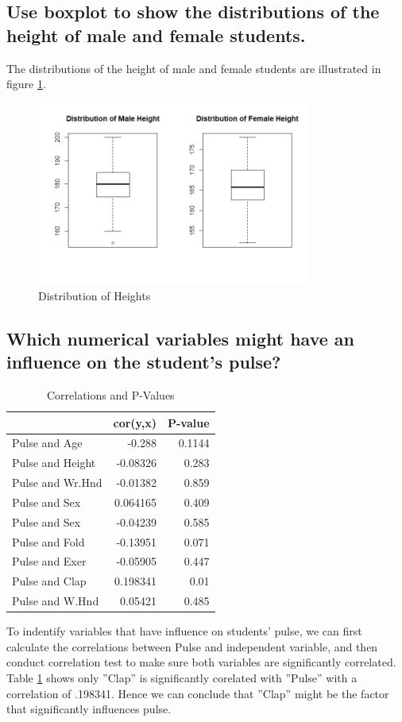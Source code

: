 \documentclass{zjureport}
\begin{document}
\subsection{Use boxplot to show the distributions of the height of male and female students.}
The distributions of the height of male and female students are illustrated in figure \ref{distribution1}. 

\begin{figure}[!ht]
	\centering
	\includegraphics[width=0.8\textwidth]{Rplot.png}
	\caption{Distribution of Heights}
	\label{distribution1}
\end{figure}

\subsection{Which numerical variables might have an influence on the student's pulse?}
\begin{table}[htbp]
  \centering
  \caption{Correlations and P-Values }
      \begin{tabular}{lrr}
                \toprule[1.5pt]
          & \multicolumn{1}{l}{cor(y,x)} & \multicolumn{1}{l}{P-value} \\
          \toprule[1.5pt]
    Pulse and Age & -0.288 & 0.1144 \\
    Pulse and Height & -0.08326 & 0.283 \\
    Pulse and Wr.Hnd & -0.01382 & 0.859 \\
    Pulse and Sex & 0.064165 & 0.409 \\
    Pulse and Sex & -0.04239 & 0.585 \\
    Pulse and Fold & -0.13951 & 0.071 \\
    Pulse and Exer & -0.05905 & 0.447 \\
    Pulse and Clap & 0.198341 & 0.01 \\
    Pulse and W.Hnd & 0.05421 & 0.485 \\
              \toprule[1.5pt]
        \end{tabular}%
  \label{cor}%
\end{table}%
To indentify variables that have influence on students' pulse, we can first calculate the correlations between Pulse and independent variable, and then conduct correlation test to make sure both variables are significantly correlated. Table \ref{cor} shows only ''Clap'' is significantly corelated with ''Pulse'' with a correlation of .198341. Hence we can conclude that ''Clap'' might be the factor that significantly influences pulse.
\end{document}
